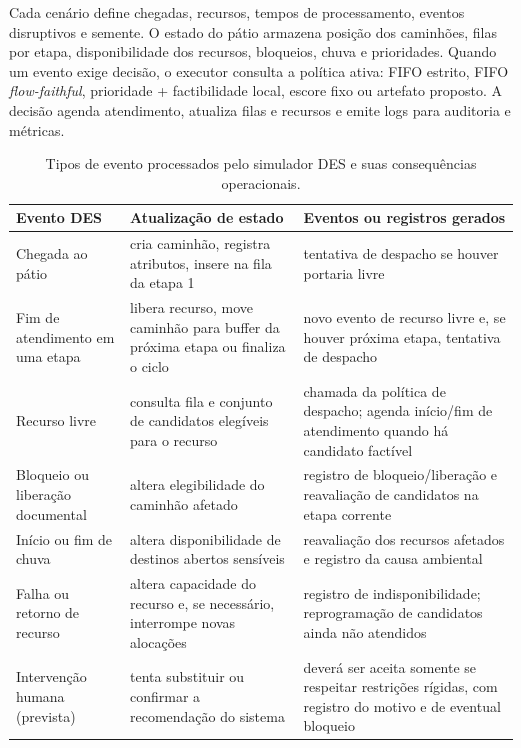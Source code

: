 \documentclass[
  12pt,
  oneside,
  a4paper,
  sumario=tradicional,
  brazil
]{abntex2}
\begin{document}
Cada cen\'ario define chegadas, recursos, tempos de processamento, eventos disruptivos e semente. O estado do p\'atio armazena posi\c{c}\~ao dos caminh\~oes, filas por etapa, disponibilidade dos recursos, bloqueios, chuva e prioridades. Quando um evento exige decis\~ao, o executor consulta a pol\'itica ativa: FIFO estrito, FIFO \textit{flow-faithful}, prioridade + factibilidade local, escore fixo ou artefato proposto. A decis\~ao agenda atendimento, atualiza filas e recursos e emite logs para auditoria e m\'etricas.

\begin{table}[H]
\centering
\small
\setlength{\tabcolsep}{5pt}
\renewcommand{\arraystretch}{1.18}
\begin{tabularx}{\textwidth}{@{}P{0.22\textwidth}P{0.33\textwidth}Y@{}}
\toprule
{}
\textbf{Evento DES} & \textbf{Atualiza\c{c}\~ao de estado} & \textbf{Eventos ou registros gerados} \\
\midrule
Chegada ao p\'atio & cria caminh\~ao, registra atributos, insere na fila da etapa 1 & tentativa de despacho se houver portaria livre \\
\addlinespace
Fim de atendimento em uma etapa & libera recurso, move caminh\~ao para buffer da pr\'oxima etapa ou finaliza o ciclo & novo evento de recurso livre e, se houver pr\'oxima etapa, tentativa de despacho \\
\addlinespace
Recurso livre & consulta fila e conjunto de candidatos eleg\'iveis para o recurso & chamada da pol\'itica de despacho; agenda in\'icio/fim de atendimento quando h\'a candidato fact\'ivel \\
\addlinespace
Bloqueio ou libera\c{c}\~ao documental & altera elegibilidade do caminh\~ao afetado & registro de bloqueio/libera\c{c}\~ao e reavalia\c{c}\~ao de candidatos na etapa corrente \\
\addlinespace
In\'icio ou fim de chuva & altera disponibilidade de destinos abertos sens\'iveis & reavalia\c{c}\~ao dos recursos afetados e registro da causa ambiental \\
\addlinespace
Falha ou retorno de recurso & altera capacidade do recurso e, se necess\'ario, interrompe novas aloca\c{c}\~oes & registro de indisponibilidade; reprograma\c{c}\~ao de candidatos ainda n\~ao atendidos \\
\addlinespace
Interven\c{c}\~ao humana (prevista) & tenta substituir ou confirmar a recomenda\c{c}\~ao do sistema & dever\'a ser aceita somente se respeitar restri\c{c}\~oes r\'igidas, com registro do motivo e de eventual bloqueio \\
\bottomrule
\end{tabularx}
\caption[Eventos do simulador DES]{Tipos de evento processados pelo simulador DES e suas consequ\^encias operacionais.}
\label{tab:eventos-des}
\end{table}
\end{document}
